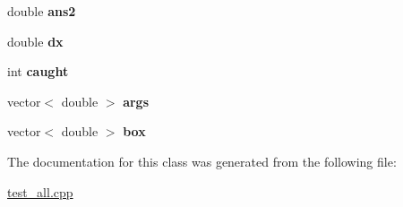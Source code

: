 \begin{DoxyCompactItemize}
\item 
\hypertarget{classAtomEnergy_a25a73160ca84c702d0de62e0e86fa59e}{double {\bfseries ans2}}\label{classAtomEnergy_a25a73160ca84c702d0de62e0e86fa59e}

\item 
\hypertarget{classAtomEnergy_abc52a8e7f982edcd37c09e9ab72dffc8}{double {\bfseries dx}}\label{classAtomEnergy_abc52a8e7f982edcd37c09e9ab72dffc8}

\item 
\hypertarget{classAtomEnergy_a50a6548a25c31b221473d0296300d6fe}{int {\bfseries caught}}\label{classAtomEnergy_a50a6548a25c31b221473d0296300d6fe}

\item 
\hypertarget{classAtomEnergy_a0d83aa8d26816a46f62c8939288bd439}{vector$<$ double $>$ {\bfseries args}}\label{classAtomEnergy_a0d83aa8d26816a46f62c8939288bd439}

\item 
\hypertarget{classAtomEnergy_a69000750c3aba79151d9db9d1debc3c9}{vector$<$ double $>$ {\bfseries box}}\label{classAtomEnergy_a69000750c3aba79151d9db9d1debc3c9}

\end{DoxyCompactItemize}


The documentation for this class was generated from the following file\-:\begin{DoxyCompactItemize}
\item 
\hyperlink{test__all_8cpp}{test\-\_\-all.\-cpp}\end{DoxyCompactItemize}
